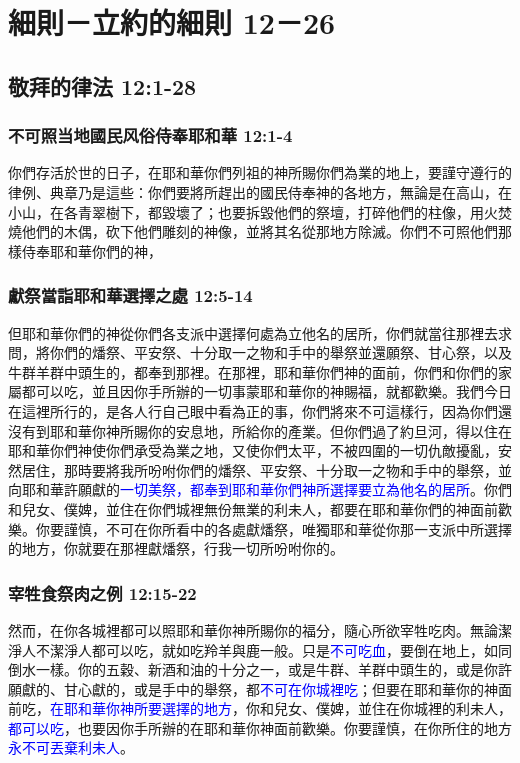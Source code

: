 \section{細則－立約的細則 12－26}
\subsection{敬拜的律法 12:1-28}
\subsubsection{不可照当地國民风俗侍奉耶和華 12:1-4}
你們存活於世的日子，在耶和華你們列祖的神所賜你們為業的地上，要謹守遵行的律例、典章乃是這些：你們要將所趕出的國民侍奉神的各地方，無論是在高山，在小山，在各青翠樹下，都毀壞了；也要拆毀他們的祭壇，打碎他們的柱像，用火焚燒他們的木偶，砍下他們雕刻的神像，並將其名從那地方除滅。你們不可照他們那樣侍奉耶和華你們的神， 

\subsubsection{獻祭當詣耶和華選擇之處 12:5-14}
但耶和華你們的神從你們各支派中選擇何處為立他名的居所，你們就當往那裡去求問，將你們的燔祭、平安祭、十分取一之物和手中的舉祭並還願祭、甘心祭，以及牛群羊群中頭生的，都奉到那裡。在那裡，耶和華你們神的面前，你們和你們的家屬都可以吃，並且因你手所辦的一切事蒙耶和華你的神賜福，就都歡樂。我們今日在這裡所行的，是各人行自己眼中看為正的事，你們將來不可這樣行，因為你們還沒有到耶和華你神所賜你的安息地，所給你的產業。但你們過了約旦河，得以住在耶和華你們神使你們承受為業之地，又使你們太平，不被四圍的一切仇敵擾亂，安然居住，那時要將我所吩咐你們的燔祭、平安祭、十分取一之物和手中的舉祭，並向耶和華許願獻的\textcolor{blue}{一切美祭，都奉到耶和華你們神所選擇要立為他名的居所}。你們和兒女、僕婢，並住在你們城裡無份無業的利未人，都要在耶和華你們的神面前歡樂。你要謹慎，不可在你所看中的各處獻燔祭，唯獨耶和華從你那一支派中所選擇的地方，你就要在那裡獻燔祭，行我一切所吩咐你的。

\subsubsection{宰牲食祭肉之例 12:15-22}
然而，在你各城裡都可以照耶和華你神所賜你的福分，隨心所欲宰牲吃肉。無論潔淨人不潔淨人都可以吃，就如吃羚羊與鹿一般。只是\textcolor{blue}{不可吃血}，要倒在地上，如同倒水一樣。你的五穀、新酒和油的十分之一，或是牛群、羊群中頭生的，或是你許願獻的、甘心獻的，或是手中的舉祭，都\textcolor{blue}{不可在你城裡吃}；但要在耶和華你的神面前吃，\textcolor{blue}{在耶和華你神所要選擇的地方}，你和兒女、僕婢，並住在你城裡的利未人，\textcolor{blue}{都可以吃}，也要因你手所辦的在耶和華你神面前歡樂。你要謹慎，在你所住的地方\textcolor{blue}{永不可丟棄利未人}。

